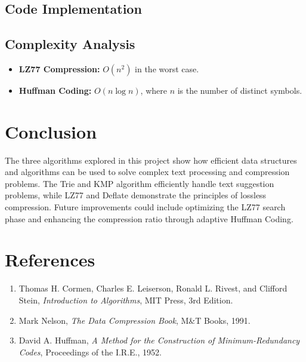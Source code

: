 \documentclass[10pt,a4paper]{report}
\begin{document}
\section{Code Implementation}


\section{Complexity Analysis}
\begin{itemize}
    \item \textbf{LZ77 Compression:} $O(n^2)$ in the worst case.
    \item \textbf{Huffman Coding:} $O(n \log n)$, where $n$ is the number of distinct symbols.
\end{itemize}

\chapter{Conclusion}
The three algorithms explored in this project show how efficient data structures and algorithms can be used to solve complex text processing and compression problems. The Trie and KMP algorithm efficiently handle text suggestion problems, while LZ77 and Deflate demonstrate the principles of lossless compression. Future improvements could include optimizing the LZ77 search phase and enhancing the compression ratio through adaptive Huffman Coding.

\chapter{References}
\begin{enumerate}
    \item Thomas H. Cormen, Charles E. Leiserson, Ronald L. Rivest, and Clifford Stein, \textit{Introduction to Algorithms}, MIT Press, 3rd Edition.
    \item Mark Nelson, \textit{The Data Compression Book}, M\&T Books, 1991.
    \item David A. Huffman, \textit{A Method for the Construction of Minimum-Redundancy Codes}, Proceedings of the I.R.E., 1952.
\end{enumerate}
\end{document}
